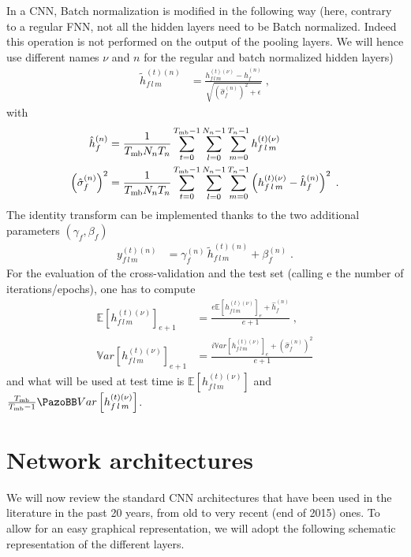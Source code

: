 In a CNN, Batch normalization is modified in the following way (here, contrary to a regular FNN, not all the hidden layers need to be Batch normalized. Indeed this operation is not performed on the output of the pooling layers. We will hence use different names $\nu$ and $n$ for the regular and batch normalized hidden layers) 
\begin{align}
\tilde{h}_{f\,l\,m}^{(t)(n)}&=\frac{h_{f\,l\,m}^{(t)(\nu)}-\hat{h}_{f}^{(n)}}
%
{\sqrt{\left(\hat{\sigma}_{f}^{(n)}\right)^2+\epsilon}}\;,
\end{align}
with
\begin{align}
\hat{h}_{f}^{(n)}&=
%
\frac{1}{T_{{\rm mb}}N_nT_n}\sum^{T_{{\rm mb}}-1}_{t=0}\sum^{N_n-1}_{l=0}\sum^{T_n-1}_{m=0}h_{f\,l\,m}^{(t)(\nu)}\\
%
\left(\hat{\sigma}_{f}^{(n)}\right)^2&=\frac{1}{T_{{\rm mb}}N_nT_n}\sum^{T_{{\rm mb}}-1}_{t=0}
%
\sum^{N_n-1}_{l=0}\sum^{T_n-1}_{m=0}\left(h_{f\,l\,m}^{(t)(\nu)}-\hat{h}_{f}^{(n)}\right)^2\;.
\end{align}
The identity transform can be implemented thanks to the two additional parameters $(\gamma_f,\beta_f)$ 
\begin{align}
y^{(t)(n)}_{f\,l\,m}&=\gamma^{(n)}_f\,\tilde{h}_{f\,l\,m}^{(t)(n)}+\beta^{(n)}_f\;.
\end{align}
For the evaluation of the cross-validation and the test set (calling e the number of iterations/epochs), one has to compute
\begin{align}
\mathbb{E}\left[h_{f\,l\,m}^{(t)(\nu)}\right]_{e+1} &=
%
\frac{e\mathbb{E}\left[h_{f\,l\,m}^{(t)(\nu)}\right]_{e}+\hat{h}_{f}^{(n)}}{e+1}\;,\\
%
\mathbb{V}ar\left[h_{f\,l\,m}^{(t)(\nu)}\right]_{e+1} &=
%
\frac{i\mathbb{V}ar\left[h_{f\,l\,m}^{(t)(\nu)}\right]_{e}+\left(\hat{\sigma}_{f}^{(n)}\right)^2}{e+1}
\end{align}
and what will be used at test time is $\mathbb{E}\left[h_{f\,l\,m}^{(t)(\nu)}\right]$ and $\frac{T_{{\rm mb}}}{T_{{\rm mb}}-1}\mathbb{V}ar\left[h_{f\,l\,m}^{(t)(\nu)}\right]$.


\section{Network architectures}

We will now review the standard CNN architectures that have been used in the literature in the past 20 years, from old to very recent (end of 2015) ones. To allow for an easy graphical representation, we will adopt the following schematic representation of the different layers.


